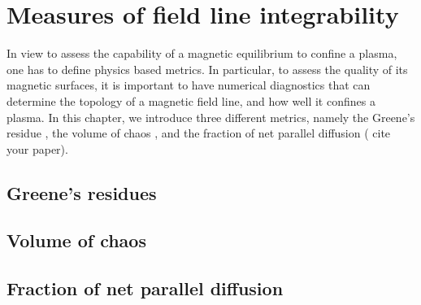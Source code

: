 \documentclass[my_thesis.tex]{subfiles}
\begin{document}
\chapter{Measures of field line integrability}

In view to assess the capability of a magnetic equilibrium to confine a plasma, one has to define physics based metrics. In particular, to assess the quality of its 
magnetic surfaces, it is important to have numerical diagnostics that can determine the topology of a magnetic field line, and how well it confines a plasma. In this chapter, we introduce three different metrics, namely the Greene's residue \citep{Greene1968,Greene1978}, the volume of chaos \citep{Loizu2017}, and the fraction of net parallel diffusion ({\color{red} cite your paper}).

\section{Greene's residues}


\section{Volume of chaos}


\section{Fraction of net parallel diffusion}
\end{document}

